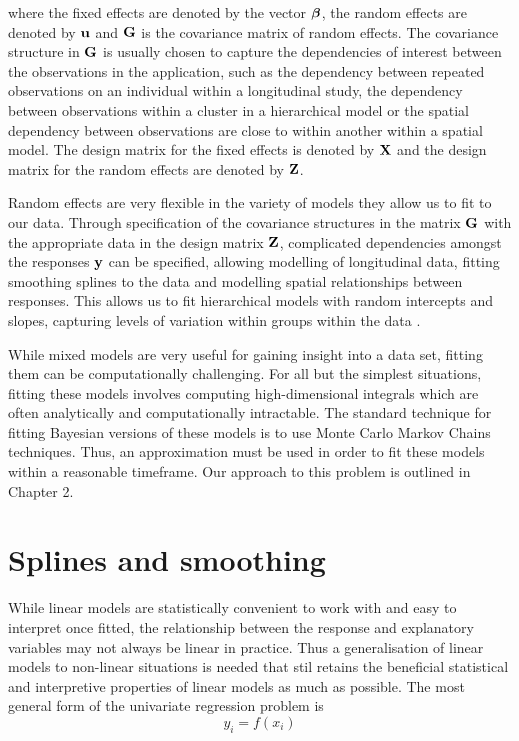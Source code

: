 where the fixed effects are denoted by the vector ${\boldsymbol \beta}$, the random effects
are denoted by ${\bf u}$ and ${\bf G}$ is the covariance matrix of random effects. The
covariance structure in ${\bf G}$ is usually chosen to capture the dependencies of
interest between the observations in the application, such as the dependency
between repeated observations on an individual within a longitudinal study, the
dependency between observations within a cluster in a hierarchical model or the
spatial dependency between observations are close to within another within a
spatial model. The design matrix for the fixed effects is denoted by ${\bf X}$ and
the design matrix for the random effects are denoted by ${\bf Z}$.

Random effects are very flexible in the variety of models they allow us to fit
to our data. Through specification of the covariance structures in the matrix
${\bf G}$ with the appropriate data in the design matrix ${\bf Z}$, complicated
dependencies amongst the responses ${\bf y}$ can be specified, allowing modelling of
longitudinal data, fitting smoothing splines to the data and modelling spatial
relationships between responses. This allows us to fit hierarchical models with
random intercepts and slopes, capturing levels of variation within groups within
the data \citep{Gelman2007}.

While mixed models are very useful for gaining insight into a data set, fitting
them can be computationally challenging. For all but the simplest situations,
fitting these models involves computing high-dimensional integrals which are
often analytically and computationally intractable. The standard technique for
fitting Bayesian versions of these models is to use Monte Carlo Markov Chains
techniques. Thus, an approximation must be used in order to fit these models
within a reasonable timeframe. Our approach to this problem is outlined in
Chapter 2.

\section{Splines and smoothing}

While linear models are statistically convenient to work with and easy to
interpret once fitted, the relationship between the response and explanatory
variables may not always be linear in practice. Thus a generalisation of linear
models to non-linear situations is needed that stil retains the beneficial
statistical and interpretive properties of linear models as much as possible.
The most general form of the univariate regression problem is
$$ y_i = f(x_i) $$


